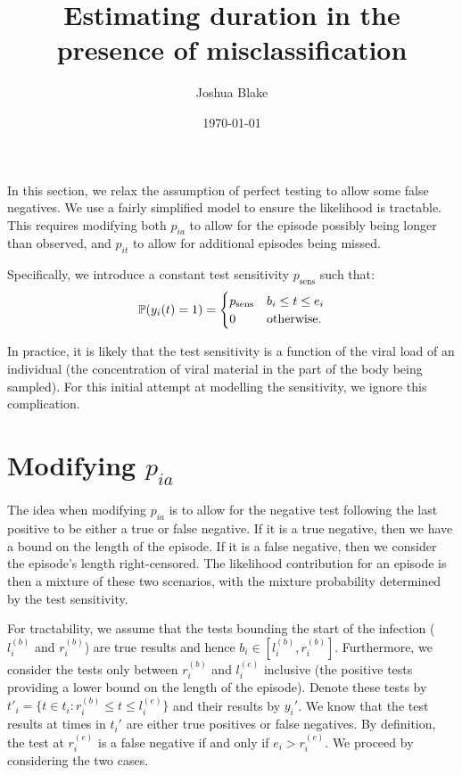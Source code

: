 \documentclass[main.tex]{subfiles}
\title{Estimating duration in the presence of misclassification}
\author{Joshua Blake}
\date{\today}
\begin{document}
\maketitle

In this section, we relax the assumption of perfect testing to allow
some false negatives. We use a fairly simplified model to ensure the
likelihood is tractable. This requires modifying both $p_{ia}$ to
allow for the episode possibly being longer than observed, and
$p_{it}$ to allow for additional episodes being missed.

Specifically, we introduce a constant test sensitivity $p_\text{sens}$
such that:
\begin{align}
\operatorname{\mathbb{P}}(y_i(t) = 1) = \begin{cases} p_\text{sens} &b_i \leq t \leq e_i \\ 0 &\text{otherwise.}\end{cases}
\end{align}

In practice, it is likely that the test sensitivity is a function of the
viral load of an individual (the concentration of viral material in the
part of the body being sampled). For this initial attempt at modelling
the sensitivity, we ignore this complication.

\section{Modifying $p_{ia}$} \label{modifying-p_ia}

The idea when modifying $p_{ia}$ is to allow for the negative test
following the last positive to be either a true or false negative. If it
is a true negative, then we have a bound on the length of the episode.
If it is a false negative, then we consider the episode's length
right-censored. The likelihood contribution for an episode is then a
mixture of these two scenarios, with the mixture probability determined
by the test sensitivity.

For tractability, we assume that the tests bounding the start of the
infection ($l_i^{(b)}$ and $r_i^{(b)}$) are true results and hence
$b_i \in [l_i^{(b)}, r_i^{(b)}]$. Furthermore, we consider the tests
only between $r_i^{(b)}$ and $l_i^{(e)}$ inclusive (the positive
tests providing a lower bound on the length of the episode). Denote
these tests by
$t'_i = \{ t \in t_i : r_i^{(b)} \leq t \leq l_i^{(e)} \}$ and their
results by $y_i'$. We know that the test results at times in $t_i'$
are either true positives or false negatives. By definition, the test at
$r_i^{(e)}$ is a false negative if and only if $e_i > r_i^{(e)}$. We
proceed by considering the two cases.
\end{document}
